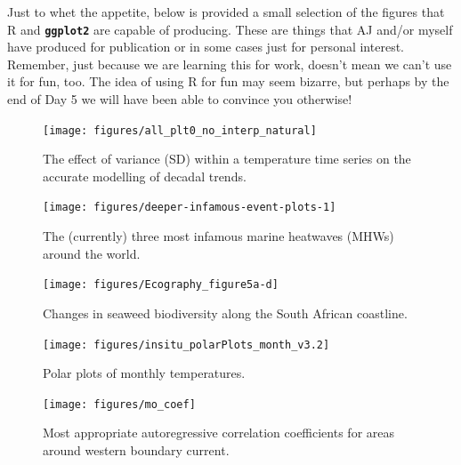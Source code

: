 \documentclass[
]{book}
\begin{document}
Just to whet the appetite, below is provided a small selection of the figures that R and \textbf{\texttt{ggplot2}} are capable of producing. These are things that AJ and/or myself have produced for publication or in some cases just for personal interest. Remember, just because we are learning this for work, doesn't mean we can't use it for fun, too. The idea of using R for fun may seem bizarre, but perhaps by the end of Day 5 we will have been able to convince you otherwise!

\begin{figure}

{\centering \texttt{[image: figures/all\_plt0\_no\_interp\_natural]} 

}

\caption{The effect of variance (SD) within a temperature time series on the accurate modelling of decadal trends.}\label{fig:example1}
\end{figure}

\begin{figure}

{\centering \texttt{[image: figures/deeper-infamous-event-plots-1]} 

}

\caption{The (currently) three most infamous marine heatwaves (MHWs) around the world.}\label{fig:example2}
\end{figure}

\begin{figure}

{\centering \texttt{[image: figures/Ecography\_figure5a-d]} 

}

\caption{Changes in seaweed biodiversity along the South African coastline.}\label{fig:example4}
\end{figure}

\begin{figure}

{\centering \texttt{[image: figures/insitu\_polarPlots\_month\_v3.2]} 

}

\caption{Polar plots of monthly temperatures.}\label{fig:example16}
\end{figure}

\begin{figure}

{\centering \texttt{[image: figures/mo\_coef]} 

}

\caption{Most appropriate autoregressive correlation coefficients for areas around western boundary current.}\label{fig:example9}
\end{figure}
\end{document}
